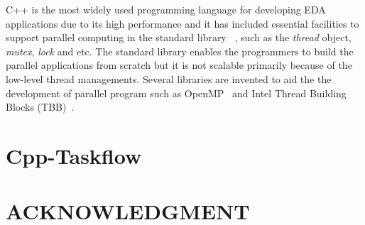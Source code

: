 \documentclass[sigconf]{acmart}
\begin{document}
C++ is the most widely used programming language for developing EDA
applications due to its high performance and it has included essential
facilities to support parallel computing in the standard library ~\cite{cpp-thread}, such as the
\textit{thread} object, \textit{mutex}, \textit{lock} and etc.  The standard
library enables the programmers to build the parallel applications from scratch 
but it is not scalable primarily because of the low-level thread managements.
Several libraries are invented to aid the the development of parallel program such as 
OpenMP~\cite{openmp} and Intel Thread Building Blocks (TBB)~\cite{tbb}. 




\section{Cpp-Taskflow}



\section{ACKNOWLEDGMENT}




%
%


\end{document}
